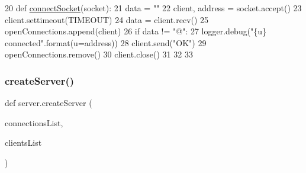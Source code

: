 \begin{DoxyCode}
20 \textcolor{keyword}{def }\hyperlink{namespaceserver_a5dce7c3abe85653dccf395dfb4f4b664}{connectSocket}(socket):
21      data = \textcolor{stringliteral}{""}
22      client, address = socket.accept()
23      client.settimeout(TIMEOUT)
24      data =  client.recv()
25      openConnections.append(client)
26      \textcolor{keywordflow}{if} data != \textcolor{stringliteral}{"@"}:
27           logger.debug(\textcolor{stringliteral}{"\{u\} connected"}.format(u=address))
28           client.send(\textcolor{stringliteral}{"OK"})
29      openConnections.remove()
30      client.close()
31      
32      
33 
\end{DoxyCode}
\mbox{\label{namespaceserver_a240f07b12d57cfa5cff5612501fe7dc8}} 
\subsubsection{\texorpdfstring{create\+Server()}{createServer()}}
{\footnotesize\ttfamily def server.\+create\+Server (\begin{DoxyParamCaption}\item[{}]{connections\+List,  }\item[{}]{clients\+List }\end{DoxyParamCaption})}


